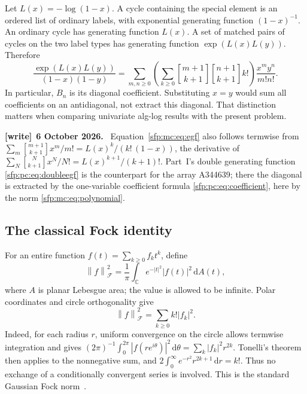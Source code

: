\documentclass[11pt,letterpaper]{article}
\numberwithin{equation}{section}
\theoremstyle{definition}\newtheorem{definition}[theorem]{Definition}
\theoremstyle{remark}\newtheorem{remark}[theorem]{Remark}
\newcommand{\CC}{\mathbb C}
\newcommand{\sone}[2]{\genfrac{[}{]}{0pt}{}{#1}{#2}}
\newcommand{\stir}{\sone}
\newcommand{\dd}{\,\mathrm d}
\newcommand{\Fock}[1]{\left\lVert #1\right\rVert_{\mathcal F}^{2}}
\newenvironment{writenote}[1][]{\par\smallskip\begingroup\small
 \noindent\textbf{[write]}\if\relax\detokenize{#1}\relax\else~\textbf{#1.}\fi\ }%
 {\par\endgroup\smallskip}
\begin{document}
Let $L(x)=-\log(1-x)$. A cycle containing the special element is
an ordered list of ordinary labels, with exponential generating
function $(1-x)^{-1}$. An ordinary cycle has generating function
$L(x)$. A set of matched pairs of cycles on the two label types
has generating function $\exp(L(x)L(y))$. Therefore
\begin{equation}\label{sfp:mc:eq:egf}
 \frac{\exp(L(x)L(y))}{(1-x)(1-y)}
 =\sum_{m,n\geq0}\left(\sum_{k\geq0}
   \stir{m+1}{k+1}\stir{n+1}{k+1}k!\right)
   \frac{x^m y^n}{m!n!}.
\end{equation}
In particular, $B_n$ is its diagonal coefficient. Substituting
$x=y$ would sum all coefficients on an antidiagonal, not extract
this diagonal. That distinction matters when comparing univariate
alg-log results with the present problem.
\begin{writenote}[6 October 2026]
Equation~\eqref{sfp:mc:eq:egf} also follows termwise from $\sum_m\stir{m+1}{k+1}x^m/m!=L(x)^k/(k!\,(1-x))$, the derivative of $\sum_N\stir N{k+1}x^N/N!=L(x)^{k+1}/(k+1)!$. Part~I's double generating function \eqref{sfp:pc:eq:doubleegf} is the counterpart for the array A344639; there the diagonal is extracted by the one-variable coefficient formula \eqref{sfp:pc:eq:coefficient}, here by the norm \eqref{sfp:mc:eq:polynomial}.
\end{writenote}

\subsection{The classical Fock identity}
For an entire function $f(t)=\sum_{k\geq0}f_kt^k$, define
\begin{equation}\label{sfp:mc:eq:norm}
 \Fock{f}=\frac1\pi\int_{\CC}e^{-|t|^2}|f(t)|^2\dd A(t),
\end{equation}
where $A$ is planar Lebesgue area; the value is allowed to be
infinite. Polar coordinates and circle orthogonality give
\begin{equation}\label{sfp:mc:eq:fock}
 \Fock{f}=\sum_{k\geq0}k!|f_k|^2.
\end{equation}
Indeed, for each radius $r$, uniform convergence on the circle
allows termwise integration and gives
$(2\pi)^{-1}\int_0^{2\pi}|f(re^{i\theta})|^2\dd\theta
=\sum_k|f_k|^2r^{2k}$. Tonelli's theorem then applies to the
nonnegative sum, and
$2\int_0^\infty e^{-r^2}r^{2k+1}\dd r=k!$.
Thus no exchange of a conditionally convergent series is involved.
This is the standard Gaussian Fock norm~\cite{alpayporat}.
\end{document}
